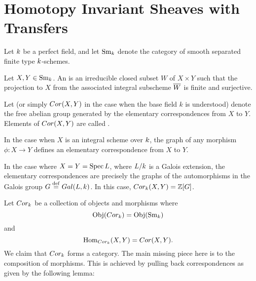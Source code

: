 \newpage
\section{Homotopy Invariant Sheaves with Transfers}\label{sect_hist}

Let $k$ be a perfect field, and let $\mathrm{Sm}_{k}$ denote the 
category of smooth separated finite type $k$-schemes.

\begin{defn}\label{def_cor}
Let $X, Y \in \mathrm{Sm}_{k}$. An  is an irreducible closed subset $W$ of $X \times Y$ such that 
the projection to $X$ from the associated integral subscheme 
$\overline{W}$ is finite and surjective.

Let  (or simply $Cor(X, Y)$ in the 
case when the base field $k$ is understood) denote the free 
abelian group generated by the elementary correspondences from 
$X$ to $Y$. Elements of $Cor(X, Y)$ are called .
\end{defn}

\begin{ex}
In the case when $X$ is an integral scheme over $k$, the 
graph of any morphism $\phi: X \to Y$ defines an elementary 
correspondence from $X$ to $Y$. 

In the case where $X = Y = \mathrm{Spec}\, L$, where $L/k$ is a 
Galois extension, the elementary correspondences are precisely the 
graphs of the automorphisms in the Galois group $G \stackrel{\mathrm{def}}{=} Gal(L, 
k)$. In this case, $Cor_{k}(X, Y) = \mathbb{Z}[G]$.
\end{ex}

Let $Cor_{k}$ be a collection of objects and morphisms 
where 
\[
\mathrm{Obj}(Cor_k) = \mathrm{Obj}(\mathrm{Sm}_{k})
\]
and
\[
\mathrm{Hom}_{Cor_k}(X, Y) = Cor(X, Y).
\]
We claim that $Cor_{k}$ forms a category. The main 
missing piece here is to the composition of morphisms. This is 
achieved by pulling back correspondences as given by the following 
lemma:

